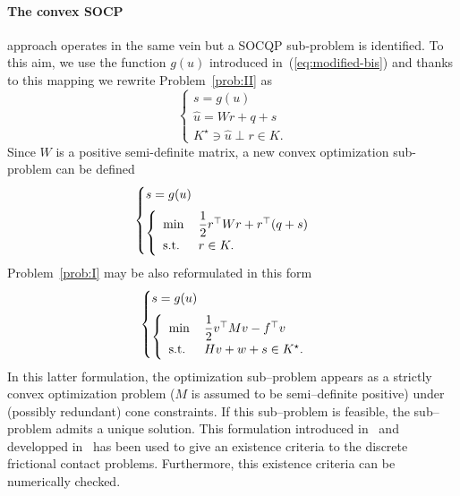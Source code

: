 \paragraph{ The convex SOCP} approach operates in the same vein but a  SOCQP sub-problem is identified. To this aim, we use the function $g(u)$ introduced in~(\ref{eq:modified-bis}) and thanks to this mapping we rewrite Problem~\ref{prob:II} as
\begin{equation}\label{eq:ACLM-2}
  \begin{cases}
    s = g(u) \\[2mm]
    \hat u = W r + q + s  \\[2mm]
    K^\star \ni {\hat u} \perp r \in K.
  \end{cases}
\end{equation} 
Since $W$ is a positive semi-definite matrix, a new convex optimization sub-problem can be defined 
\begin{equation}\label{eq:ACLM-3}
  \begin{cases}
    s = g(u) \\[2mm]
    \left\{
      \begin{array}{ll}
        \min\,&\Frac 1 2 r^\top W r + r^\top (q + s)  \\
        \text{s.t. } & r \in K.
      \end{array}
    \right.
  \end{cases}
\end{equation} 
Problem~\ref{prob:I} may be also reformulated in this form
\begin{equation}\label{eq:ACLM-4}
  \begin{cases}
    s = g(u) \\[2mm]
    \left\{
      \begin{array}{ll}
        \min\,&\Frac 1 2 v^\top M v -  f^\top v  \\
        \text{s.t. } & H v  + w + s  \in K^\star.
      \end{array}
    \right.
  \end{cases}
\end{equation} 
In this latter formulation, the optimization sub--problem appears as a strictly convex optimization problem ($M$ is assumed to be semi--definite positive) under (possibly redundant) cone constraints. If this sub--problem is feasible, the sub--problem admits a unique solution. This formulation introduced in~\cite{Cadoux2009} and developped in~\cite{Acary.Cadoux2013,Acary.ea_ZAMM2011} has been used to give an existence criteria to the discrete frictional contact problems. Furthermore, this existence criteria can be numerically checked. 
\clearpage
